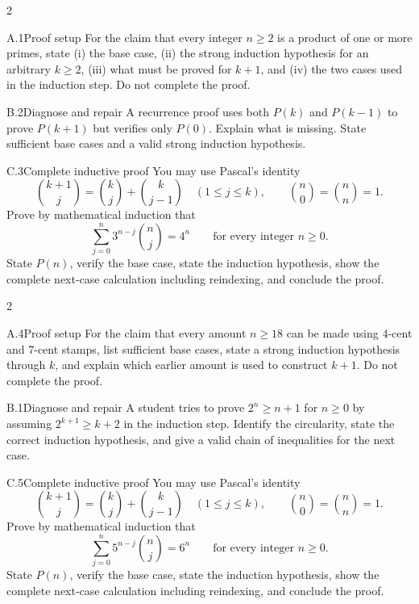\documentclass[9pt]{extarticle}
\begin{document}
\CoreWorkArea
\FormBreak
{}
\begin{multicols}{2}
\begin{CompactCoreProblem}{A.1}{Proof setup}
For the claim that every integer $n\ge2$ is a product of one or more primes, state (i) the base case, (ii) the strong induction hypothesis for an arbitrary $k\ge2$, (iii) what must be proved for $k+1$, and (iv) the two cases used in the induction step. Do not complete the proof.
\end{CompactCoreProblem}
\begin{CompactCoreProblem}{B.2}{Diagnose and repair}
A recurrence proof uses both $P(k)$ and $P(k-1)$ to prove $P(k+1)$ but verifies only $P(0)$. Explain what is missing. State sufficient base cases and a valid strong induction hypothesis.
\end{CompactCoreProblem}
\end{multicols}
\begin{CompactCoreProblem}{C.3}{Complete inductive proof}
You may use Pascal's identity
\[
\binom{k+1}{j}=\binom{k}{j}+\binom{k}{j-1}
\quad(1\le j\le k),\qquad
\binom{n}{0}=\binom{n}{n}=1.
\]
Prove by mathematical induction that
\[
\sum_{j=0}^{n} 3^{n-j}\binom{n}{j}=4^n\qquad\text{for every integer }n\ge0.
\]
State $P(n)$, verify the base case, state the induction hypothesis, show the complete next-case calculation including reindexing, and conclude the proof.
\end{CompactCoreProblem}
\CoreWorkArea
\FormBreak
{}
\begin{multicols}{2}
\begin{CompactCoreProblem}{A.4}{Proof setup}
For the claim that every amount $n\ge18$ can be made using 4-cent and 7-cent stamps, list sufficient base cases, state a strong induction hypothesis through $k$, and explain which earlier amount is used to construct $k+1$. Do not complete the proof.
\end{CompactCoreProblem}
\begin{CompactCoreProblem}{B.1}{Diagnose and repair}
A student tries to prove $2^n\ge n+1$ for $n\ge0$ by assuming $2^{k+1}\ge k+2$ in the induction step. Identify the circularity, state the correct induction hypothesis, and give a valid chain of inequalities for the next case.
\end{CompactCoreProblem}
\end{multicols}
\begin{CompactCoreProblem}{C.5}{Complete inductive proof}
You may use Pascal's identity
\[
\binom{k+1}{j}=\binom{k}{j}+\binom{k}{j-1}
\quad(1\le j\le k),\qquad
\binom{n}{0}=\binom{n}{n}=1.
\]
Prove by mathematical induction that
\[
\sum_{j=0}^{n} 5^{n-j}\binom{n}{j}=6^n\qquad\text{for every integer }n\ge0.
\]
State $P(n)$, verify the base case, state the induction hypothesis, show the complete next-case calculation including reindexing, and conclude the proof.
\end{CompactCoreProblem}
\end{document}
